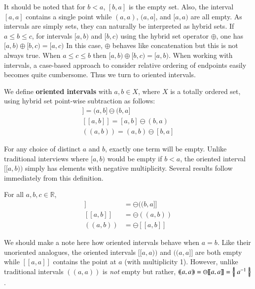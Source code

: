 It should be noted that for $b<a$, $[b,a]$ is the empty set. 
Also, the interval $[a,a]$ contains a single point while $(a,a)$, $(a,a]$, and $[a,a)$ are all empty.
As intervals are simply sets, they can naturally be interpreted as hybrid sets.
If $a \leq b \leq c$, for intervals $[a,b)$ and $[b,c)$ using the hybrid set operator $\oplus$, one has
$[a,b) \oplus [b,c) = [a,c)$
In this case, $\oplus$ behaves like concatenation but this is not always true.
When $a \leq c \leq b$ then $[a,b) \oplus [b,c) = [a,b)$.
When working with intervals, a case-based approach to consider relative ordering of endpoints easily becomes quite cumbersome.
Thus we turn to oriented intervals.

\begin{definition}
	We define \textbf{oriented intervals} with $a,b\in X$, where $X$ is a totally ordered set, 
	using hybrid set point-wise subtraction as follows:
	\begin{align}
		[\![ a,b )\!) = [a,b) \ominus [b,a) \\
		(\!( a,b ]\!] = (a,b] \ominus (b,a] \\
		[\![ a,b ]\!] = [a,b] \ominus (b,a) \\
		(\!( a,b )\!) = (a,b) \ominus [b,a]
	\end{align}
\end{definition}

For any choice of distinct $a$ and $b$, exactly one term will be empty.
Unlike traditional interviews where $[a,b)$ would be empty if $b < a$,  
the oriented interval $[\![a,b)\!)$ simply has elements with negative multiplicity.
Several results follow immediately from this definition.

\begin{theorem} For all $a,b,c \in \mathbb{R}$, 
	\begin{align}
		[\![a,b)\!) &= \ominus [\![b,a)\!) \\
		(\!(a,b]\!] &= \ominus (\!(b,a]\!] \\
		[\![a,b]\!] &= \ominus (\!(a,b)\!) \\
		(\!(a,b)\!) &= \ominus [\![a,b]\!]
	\end{align}
\end{theorem}

We should make a note here how oriented intervals behave when $a=b$.
Like their unoriented analogues, the oriented intervals $[\![ a,a )\!)$ and $(\!( a,a ]\!]$ are both empty 
while $[\![a,a]\!]$ contains the point at $a$ (with multiplicity 1).
However, unlike traditional intervals $(\!(a,a)\!)$ is \emph{not} empty but rather, $(\!(a,a)\!) = \ominus [\![a,a]\!] = \left\{ \! \left| \; a^{-1} \; \right| \! \right\}$.

